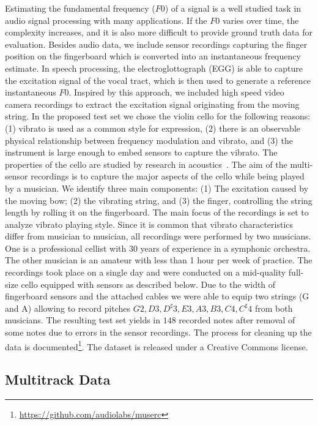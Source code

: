 Estimating the fundamental frequency ($F0$) of a signal is a well studied task in audio signal processing with many applications. If the $F0$ varies over time, the complexity increases, and it is also more difficult to provide ground truth data for evaluation.
Besides audio data, we include sensor recordings capturing the finger position on the fingerboard which is converted into an instantaneous frequency estimate. In speech processing, the electroglottograph (EGG) is able to capture the excitation signal of the vocal tract, which is then used to generate a reference instantaneous $F0$.
Inspired by this approach, we included high speed video camera recordings to extract the excitation signal originating from the moving string.
In the proposed test set we chose the violin cello for the following reasons: (1) vibrato is used as a common style for expression, (2) there is an observable physical relationship between frequency modulation and vibrato, and (3) the instrument is large enough to embed sensors to capture the vibrato. The properties of the cello are studied by research in acoustics~\cite{woodhouse04, woodhouse99}.
The aim of the multi-sensor recordings is to capture the major aspects of the cello while being played by a musician. We identify three main components: (1) The excitation caused by the moving bow; (2) the vibrating string, and (3) the finger, controlling the string length by rolling it on the fingerboard.
The main focus of the recordings is set to analyze vibrato playing style. Since it is common that vibrato characteristics differ from musician to musician, all recordings were performed by two musicians. One is a professional cellist with 30 years of experience in a symphonic orchestra. The other musician is an amateur with less than 1 hour per week of practice. The recordings took place on a single day and were conducted on a mid-quality full-size cello equipped with sensors as described below. Due to the width of fingerboard sensors and the attached cables we were able to equip two strings (G and A) allowing to record pitches ${G2, D3, D^\sharp3, E3, A3, B3, C4, C^\sharp4}$ from both musicians. The resulting test set yields in $148$ recorded notes after removal of some notes due to errors in the sensor recordings. The process for cleaning up the data is documented\footnote{\url{https://github.com/audiolabs/muserc}}. The dataset is released under a Creative Commons license.

\subsection{Multitrack Data}


